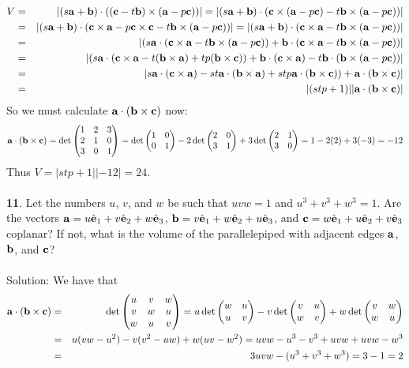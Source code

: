 \documentclass[12pt]{amsbook}
\begin{document}
\begin{eqnarray*}
V&=&|(s{\bf a}+{\bf b})\cdot(({\bf c}-t{\bf b})\times({\bf a}-p{\bf c}))|=|(s{\bf a}+{\bf b})\cdot({\bf c}\times({\bf a}-p{\bf c})-t{\bf b}\times({\bf a}-p{\bf c}))| \\
&=&|(s{\bf a}+{\bf b})\cdot({\bf c}\times{\bf a}-p{\bf c}\times{\bf c}-t{\bf b}\times({\bf a}-p{\bf c}))|=|(s{\bf a}+{\bf b})\cdot({\bf c}\times{\bf a}-t{\bf b}\times({\bf a}-p{\bf c}))|\\
&=&|(s{\bf a}\cdot({\bf c}\times{\bf a}-t{\bf b}\times({\bf a}-p{\bf c}))+{\bf b}\cdot({\bf c}\times{\bf a}-t{\bf b}\times({\bf a}-p{\bf c}))|\\
&=&|(s{\bf a}\cdot({\bf c}\times{\bf a}-t({\bf b}\times{\bf a})+tp({\bf b}\times{\bf c}))+{\bf b}\cdot({\bf c}\times{\bf a})-t{\bf b}\cdot({\bf b}\times({\bf a}-p{\bf c}))|\\
&=&|s{\bf a}\cdot({\bf c}\times{\bf a})-st{\bf a}\cdot({\bf b}\times{\bf a})+stp{\bf a}\cdot({\bf b}\times{\bf c}))+{\bf a}\cdot({\bf b}\times{\bf c})|\\
&=&|(stp+1)||{\bf a}\cdot({\bf b}\times{\bf c})|
\end{eqnarray*}
So we must calculate ${\bf a}\cdot({\bf b}\times{\bf c})$ now:
$${\bf a}\cdot({\bf b}\times{\bf c})=\det
\begin{pmatrix}
1 & 2 & 3\cr 2&1&0\cr 3&0&1 \end{pmatrix}=\det\begin{pmatrix}1&0\cr 0&1  \end{pmatrix}-2\det\begin{pmatrix}2&0\cr 3&1  \end{pmatrix}+3\det\begin{pmatrix}2&1\cr 3&0 \end{pmatrix}=1-2(2)+3(-3)=-12$$
Thus $V=|stp+1||-12|=24$.
\\
\\
{\small\bf 11}. Let the numbers $u$, $v$, and $w$ be such that $uvw=1$
and $u^3+v^3+w^3=1$. Are the vectors ${\bf a}=u\hat{\bf e}_1
+v\hat{\bf e}_2+w\hat{\bf e}_3$, ${\bf b}=v\hat{\bf e}_1
+w\hat{\bf e}_2+u\hat{\bf e}_3$, and ${\bf c}=w\hat{\bf e}_1
+u\hat{\bf e}_2+v\hat{\bf e}_3$ coplanar? If not, what is the
volume of the parallelepiped with adjacent edges ${\bf a}$, ${\bf
b}$, and ${\bf c}$?\\
\\
{\sc Solution}:
We have that
\begin{eqnarray*}
{\bf a}\cdot({\bf b}\times{\bf c})&=&\det
\begin{pmatrix}
u & v & w\cr v&w&u\cr w&u&v \end{pmatrix}=u\det\begin{pmatrix}w&u\cr u&v  \end{pmatrix}-v\det\begin{pmatrix}v&u\cr w&v  \end{pmatrix}+w\det\begin{pmatrix}v&w\cr w&u \end{pmatrix}\\
&=&u(vw-u^2)-v(v^2-uw)+w(uv-w^2)=uvw-u^3-v^3+uvw+uvw-w^3\\
&=&3uvw-(u^3+v^3+w^3)=3-1=2
\end{eqnarray*}
\end{document}
